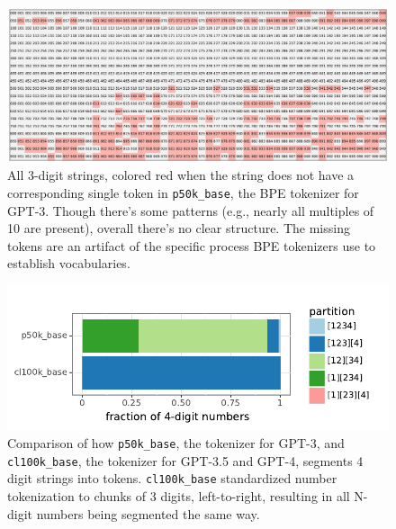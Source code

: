 \documentclass{article}
\theoremstyle{plain}
\theoremstyle{definition}
\theoremstyle{remark}
\begin{document}
\begin{figure}[ht]
    \centering
    \includegraphics[width=\textwidth]{figures/p50k_base_3digit_nowhitespace_tokens_20rows.pdf}
    \vspace{-2em}
    \caption{All 3-digit strings, colored red when the string does not have a corresponding single token in \texttt{p50k\_base}, the BPE tokenizer for GPT-3. Though there's some patterns (e.g., nearly all multiples of 10 are present), overall there's no clear structure. The missing tokens are an artifact of the specific process BPE tokenizers use to establish vocabularies.}
    \label{fig:p50k_tokens}
    \vspace{-1em}
\end{figure}

\begin{figure}[b!]
    \vspace{-2em}
    \centering
    \includegraphics[width=\columnwidth]{figures/p50k_base_4digit_nowhitespace_partitions.pdf}
     \vspace{-2em}
    \caption{Comparison of how \texttt{p50k\_base}, the tokenizer for GPT-3, and \texttt{cl100k\_base}, the tokenizer for GPT-3.5 and GPT-4, segments 4 digit strings into tokens. \texttt{cl100k\_base} standardized number tokenization to chunks of 3 digits, left-to-right, resulting in all N-digit numbers being segmented the same way.}
    \label{fig:4digit_tokenization_split}
\end{figure}
\end{document}
